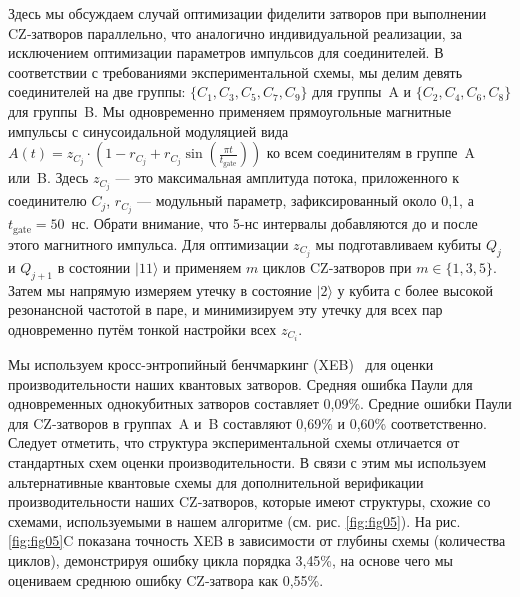 Здесь мы обсуждаем случай оптимизации фиделити затворов при выполнении
CZ‑затворов параллельно, что аналогично индивидуальной реализации, за
исключением оптимизации параметров импульсов для соединителей. В соответствии с
требованиями экспериментальной схемы, мы делим девять соединителей на две
группы: $\{C_1, C_3, C_5, C_7, C_9\}$ для группы~A и $\{C_2, C_4, C_6, C_8\}$
для группы~B.  Мы одновременно применяем прямоугольные магнитные импульсы с
синусоидальной модуляцией вида $A(t) = z_{C_j} \cdot \left( 1 - r_{C_j} +
r_{C_j} \sin\left( \frac{\pi t}{t_{\text{gate}}} \right) \right)$ ко всем
соединителям в группе~A или~B. Здесь $z_{C_j}$ — это максимальная амплитуда
потока, приложенного к соединителю $C_j$, $r_{C_j}$ — модульный параметр,
зафиксированный около 0{,}1, а $t_{\text{gate}} = 50$~нс. Обрати внимание, что
5-нс интервалы добавляются до и после этого магнитного импульса. Для
оптимизации $z_{C_j}$ мы подготавливаем кубиты $Q_j$ и $Q_{j+1}$ в состоянии
$\lvert 11 \rangle$ и применяем $m$ циклов CZ‑затворов при $m \in \{1, 3, 5\}$.
Затем мы напрямую измеряем утечку в состояние $\lvert 2 \rangle$ у кубита с
более высокой резонансной частотой в паре, и минимизируем эту утечку для всех
пар одновременно путём тонкой настройки всех $z_{C_i}$.

Мы используем кросс-энтропийный бенчмаркинг (XEB)~\cite{cite_2} для оценки
производительности наших квантовых затворов. Средняя ошибка Паули для
одновременных однокубитных затворов составляет 0{,}09\%. Средние ошибки Паули
для CZ‑затворов в группах~A и~B составляют 0{,}69\% и 0{,}60\% соответственно.
Следует отметить, что структура экспериментальной схемы отличается от
стандартных схем оценки производительности. В связи с этим мы используем
альтернативные квантовые схемы для дополнительной верификации
производительности наших CZ‑затворов, которые имеют структуры, схожие со
схемами, используемыми в нашем алгоритме (см. рис. \ref{fig:fig05}). На рис.
\ref{fig:fig05}C показана точность XEB в зависимости от глубины схемы
(количества циклов), демонстрируя ошибку цикла порядка 3{,}45\%, на основе чего
мы оцениваем среднюю ошибку CZ‑затвора как 0{,}55\%.

